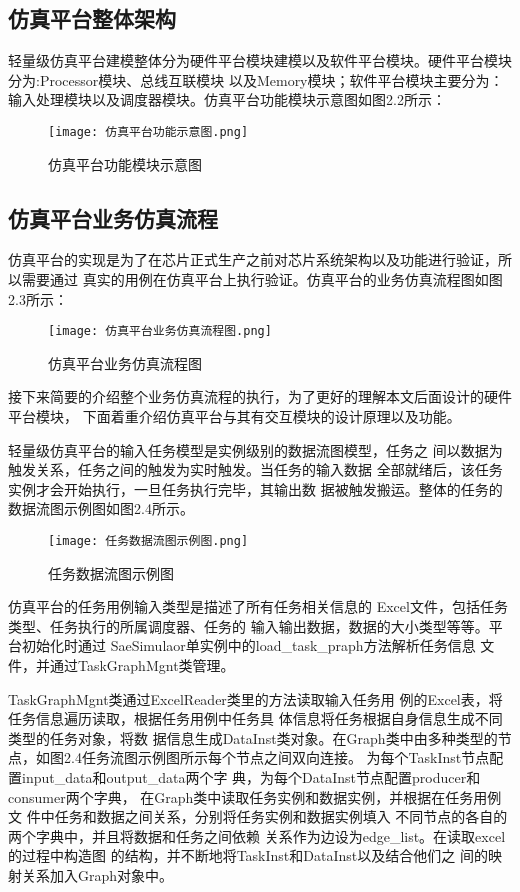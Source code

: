\subsection{仿真平台整体架构}
轻量级仿真平台建模整体分为硬件平台模块建模以及软件平台模块。硬件平台模块分为:Processor模块、总线互联模块
以及Memory模块；软件平台模块主要分为：输入处理模块以及调度器模块。仿真平台功能模块示意图如图2.2所示：

\begin{figure}
  \centering
  \texttt{[image: 仿真平台功能示意图.png]}
  \caption{仿真平台功能模块示意图}
  \label{fig:badge}
\end{figure}

\subsection{仿真平台业务仿真流程}
仿真平台的实现是为了在芯片正式生产之前对芯片系统架构以及功能进行验证，所以需要通过
真实的用例在仿真平台上执行验证。仿真平台的业务仿真流程图如图2.3所示：

\begin{figure}
  \centering
  \texttt{[image: 仿真平台业务仿真流程图.png]}
  \caption{仿真平台业务仿真流程图}
  \label{fig:badge}
\end{figure}

接下来简要的介绍整个业务仿真流程的执行，为了更好的理解本文后面设计的硬件平台模块，
下面着重介绍仿真平台与其有交互模块的设计原理以及功能。

轻量级仿真平台的输入任务模型是实例级别的数据流图模型，任务之
间以数据为触发关系，任务之间的触发为实时触发。当任务的输入数据
全部就绪后，该任务实例才会开始执行，一旦任务执行完毕，其输出数
据被触发搬运。整体的任务的数据流图示例图如图2.4所示。

\begin{figure}
    \centering
    \texttt{[image: 任务数据流图示例图.png]}
    \caption{任务数据流图示例图}
    \label{fig:badge}
\end{figure}

仿真平台的任务用例输入类型是描述了所有任务相关信息的
Excel文件，包括任务类型、任务执行的所属调度器、任务的
输入输出数据，数据的大小类型等等。平台初始化时通过
SaeSimulaor单实例中的load\_task\_praph方法解析任务信息
文件，并通过TaskGraphMgnt类管理。

TaskGraphMgnt类通过ExcelReader类里的方法读取输入任务用
例的Excel表，将任务信息遍历读取，根据任务用例中任务具
体信息将任务根据自身信息生成不同类型的任务对象，将数
据信息生成DataInst类对象。在Graph类中由多种类型的节
点，如图2.4任务流图示例图所示每个节点之间双向连接。
为每个TaskInst节点配置input\_data和output\_data两个字
典，为每个DataInst节点配置producer和consumer两个字典，
在Graph类中读取任务实例和数据实例，并根据在任务用例文
件中任务和数据之间关系，分别将任务实例和数据实例填入
不同节点的各自的两个字典中，并且将数据和任务之间依赖
关系作为边设为edge\_list。在读取excel的过程中构造图
的结构，并不断地将TaskInst和DataInst以及结合他们之
间的映射关系加入Graph对象中。

